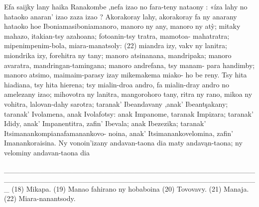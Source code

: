 Efa saijky lany haika Ranakombe ,nefa izao no fara-teny nataony :
«íza lahy no hataoko anaran' izao zaza izao ? Akorakoray lahy, akorakoray
fa ny anarany hataoko hoe Iboniamasiboniamanoro, manoro ny any, manoro
ny atỳ; mitaky mahazo, itakian-tsy azahoana; fotoanin-tsy tratra, mamotoa-
mahatratra; mipenimpenim-bola, miara-manatsoly: (22) miandra izy, vakv
ny lanitra; miondrika izy, forehitra ny tany; manoro atsinanana, mandripaka;
manoro avaratra, mandringan-tamingana; manoro andrefana, tsy manam-
para handimby; manoro atsimo, maimaim-parasy izay mikemakema miako-
ho be reny. Tsy hita hiadiana, tsy hita hierena; tsy mialin-droa andro, fa
mialin-dray andro no amelezany izao; mihovotra ny lanitra, mangorohoro
tany, ritra ny rano, mikoa ny vohitra, lalovan-dahy sarotra; taranak'
Ibeandavany ,anak' Ibeantşakany; taranak' Ivolamena, anak Ivolafotsy:
anak Impanome, taranak Impizara; taranak' Ididy, anak' Impanentitra,
zafin' Ibevala; anak Ibezezika; taranak' Itsimanankompianafamanankovo-
noina, anak' Itsimanankovelomina, zafin' Imanankoraisina. Ny vonoin'izany
andavan-taona dia maty andavąn-taona; ny velominy andavan-taona dia


_________________________________________________________________________________________________
(18) Mikapa. 
(19) Manao fahirano ny hobaboina 
(20) Tovovavy. 
(21) Manaja.
(22) Miara-nanantsody.